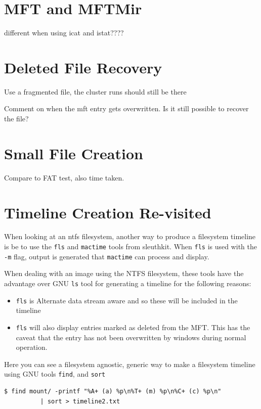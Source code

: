 \documentclass[a4paper,
    11pt,
    normalheadings,
    parindent,
    UKenglish,
    abstracton,
    ]{scrartcl}
\begin{document}
\section{MFT and MFTMir}
different when using icat and istat????

\section{Deleted File Recovery}
Use a fragmented file, the cluster runs should still be there

Comment on when the mft entry gets overwritten. Is it still possible to recover the file?

\section{Small File Creation}
Compare to FAT test, also time taken.

\section{Timeline Creation Re-visited}

When looking at an ntfs filesystem, another way to produce a filesystem timeline is be to use the \texttt{fls} and \texttt{mactime} tools from sleuthkit. When \texttt{fls} is used with the \texttt{-m} flag, output is generated that \texttt{mactime} can process and display.

When dealing with an image using the NTFS filesystem, these tools have the advantage over GNU \texttt{ls} tool for generating a timeline for the following reasons:

\begin{itemize}
        \item \texttt{fls} is Alternate data stream aware and so these will be included in the timeline
        \item \texttt{fls} will also display entries marked as deleted from the MFT. This has the caveat that the entry has not been overwritten by windows during normal operation.
\end{itemize}

Here you can see a filesystem agnostic, generic way to make a filesystem timeline using GNU tools \texttt{find}, and \texttt{sort}
\begin{verbatim}
$ find mount/ -printf "%A+ (a) %p\n%T+ (m) %p\n%C+ (c) %p\n"
          | sort > timeline2.txt
\end{verbatim}
\end{document}
